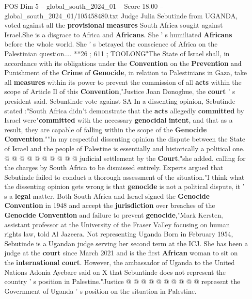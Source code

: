 \begin{textsample}{POS Dim 5 – global\_south\_2024\_01 – Score 18.00 – global\_south\_2024\_01/105458480.txt}  \label{ex:f5_pos_014}
Judge Julia Sebutinde from UGANDA, voted against all the \textbf{provisional} \textbf{measures} South Africa sought against Israel.She is a disgrace to Africa and \textbf{Africans}.
She ' s humiliated \textbf{Africans} before the whole world.
She ' s betrayed the conscience of Africa on the Palestinian question.... **26 ; 611 ; TOOLONG"The State of Israel shall, in accordance with its obligations under the \textbf{Convention} on the \textbf{Prevention} and Punishment of the \textbf{Crime} of \textbf{Genocide}, in relation to Palestinians in Gaza, take all \textbf{measures} within its power to prevent the commission of all \textbf{acts} within the scope of Article Il of this \textbf{Convention},"Justice Joan Donoghue, the \textbf{court} ' s president said.
Sebuntinde vote against SA In a dissenting opinion, Sebutinde stated :"South Africa didn't demonstrate that the \textbf{acts} allegedly \textbf{committed} by Israel were"\textbf{committed} with the necessary \textbf{genocidal} \textbf{intent}, and that as a result, they are capable of falling within the scope of the \textbf{Genocide} \textbf{Convention}.""In my respectful dissenting opinion the dispute between the State of Israel and the people of Palestine is essentially and historically a political one. @ @ @ @ @ @ @ @ @ @ judicial settlement by the \textbf{Court},"she added, calling for the charges by South Africa to be dismissed entirely.
Experts argued that Sebutinde failed to conduct a thorough assessment of the situation."I think what the dissenting opinion gets wrong is that \textbf{genocide} is not a political dispute, it ' s a \textbf{legal} matter.
Both South Africa and Israel signed the \textbf{Genocide} \textbf{Convention} in 1948 and accept the \textbf{jurisdiction} over breaches of the \textbf{Genocide} \textbf{Convention} and failure to prevent \textbf{genocide},"Mark Kersten, assistant professor at the University of the Fraser Valley focusing on human rights law, told Al Jazeera.
Not representing Uganda Born in February 1954, Sebutinde is a Ugandan judge serving her second term at the ICJ.
She has been a judge at the \textbf{court} since March 2021 and is the first \textbf{African} woman to sit on the \textbf{international} \textbf{court}.
However, the ambassador of Uganda to the United Nations Adonia Ayebare said on X that Sebuntinde does not represent the country ' s position in Palestine."Justice @ @ @ @ @ @ @ @ @ @ represent the Government of Uganda ' s position on the situation in Palestine.

\end{textsample}

